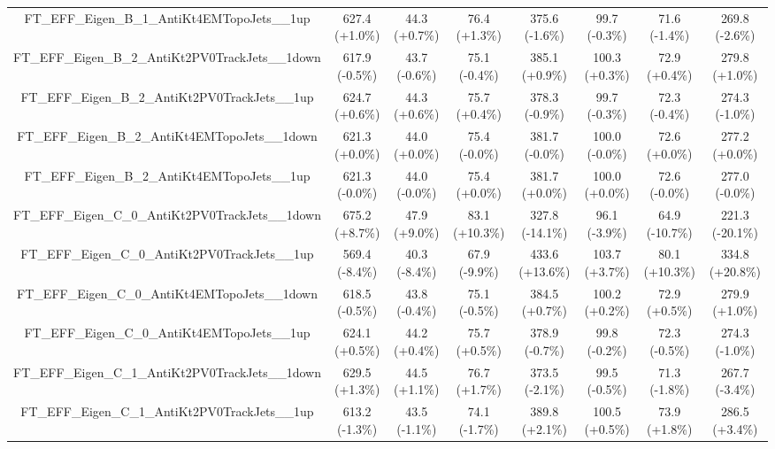 \begin{table}[htbp!]
\begin{tiny}
\begin{center}
\begin{tabular}{c|c|c|c||c|c|c|c}
FT\_EFF\_Eigen\_B\_1\_AntiKt4EMTopoJets\_\_1up               & 627.4     (+1.0\%) & 44.3      (+0.7\%) & 76.4      (+1.3\%) & 375.6     (-1.6\%) & 99.7      (-0.3\%) & 71.6      (-1.4\%) & 269.8     (-2.6\%) \\ 
FT\_EFF\_Eigen\_B\_2\_AntiKt2PV0TrackJets\_\_1down           & 617.9     (-0.5\%) & 43.7      (-0.6\%) & 75.1      (-0.4\%) & 385.1     (+0.9\%) & 100.3     (+0.3\%) & 72.9      (+0.4\%) & 279.8     (+1.0\%) \\ 
FT\_EFF\_Eigen\_B\_2\_AntiKt2PV0TrackJets\_\_1up             & 624.7     (+0.6\%) & 44.3      (+0.6\%) & 75.7      (+0.4\%) & 378.3     (-0.9\%) & 99.7      (-0.3\%) & 72.3      (-0.4\%) & 274.3     (-1.0\%) \\ 
FT\_EFF\_Eigen\_B\_2\_AntiKt4EMTopoJets\_\_1down             & 621.3     (+0.0\%) & 44.0      (+0.0\%) & 75.4      (-0.0\%) & 381.7     (-0.0\%) & 100.0     (-0.0\%) & 72.6      (+0.0\%) & 277.2     (+0.0\%) \\ 
FT\_EFF\_Eigen\_B\_2\_AntiKt4EMTopoJets\_\_1up               & 621.3     (-0.0\%) & 44.0      (-0.0\%) & 75.4      (+0.0\%) & 381.7     (+0.0\%) & 100.0     (+0.0\%) & 72.6      (-0.0\%) & 277.0     (-0.0\%) \\ 
FT\_EFF\_Eigen\_C\_0\_AntiKt2PV0TrackJets\_\_1down           & 675.2     (+8.7\%) & 47.9      (+9.0\%) & 83.1      (+10.3\%) & 327.8     (-14.1\%) & 96.1      (-3.9\%) & 64.9      (-10.7\%) & 221.3     (-20.1\%) \\ 
FT\_EFF\_Eigen\_C\_0\_AntiKt2PV0TrackJets\_\_1up             & 569.4     (-8.4\%) & 40.3      (-8.4\%) & 67.9      (-9.9\%) & 433.6     (+13.6\%) & 103.7     (+3.7\%) & 80.1      (+10.3\%) & 334.8     (+20.8\%) \\ 
FT\_EFF\_Eigen\_C\_0\_AntiKt4EMTopoJets\_\_1down             & 618.5     (-0.5\%) & 43.8      (-0.4\%) & 75.1      (-0.5\%) & 384.5     (+0.7\%) & 100.2     (+0.2\%) & 72.9      (+0.5\%) & 279.9     (+1.0\%) \\ 
FT\_EFF\_Eigen\_C\_0\_AntiKt4EMTopoJets\_\_1up               & 624.1     (+0.5\%) & 44.2      (+0.4\%) & 75.7      (+0.5\%) & 378.9     (-0.7\%) & 99.8      (-0.2\%) & 72.3      (-0.5\%) & 274.3     (-1.0\%) \\ 
FT\_EFF\_Eigen\_C\_1\_AntiKt2PV0TrackJets\_\_1down           & 629.5     (+1.3\%) & 44.5      (+1.1\%) & 76.7      (+1.7\%) & 373.5     (-2.1\%) & 99.5      (-0.5\%) & 71.3      (-1.8\%) & 267.7     (-3.4\%) \\ 
FT\_EFF\_Eigen\_C\_1\_AntiKt2PV0TrackJets\_\_1up             & 613.2     (-1.3\%) & 43.5      (-1.1\%) & 74.1      (-1.7\%) & 389.8     (+2.1\%) & 100.5     (+0.5\%) & 73.9      (+1.8\%) & 286.5     (+3.4\%) \\ 

\end{tabular}
\end{center}
\end{tiny}
\end{table}
